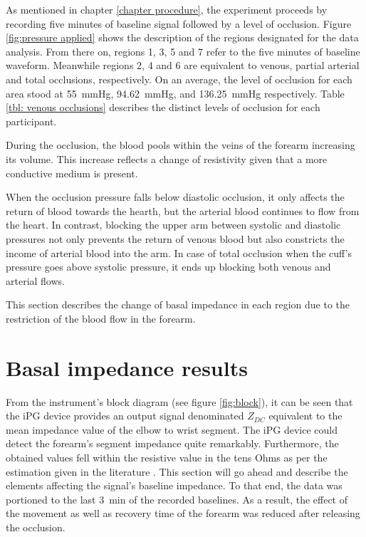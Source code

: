 As mentioned in chapter \ref{chapter procedure}, the experiment proceeds by recording five minutes of baseline signal followed by a level of occlusion. Figure \ref{fig:pressure applied} shows the description of the regions designated for the data analysis. From there on, regions 1, 3, 5 and 7 refer to the five minutes of baseline waveform. Meanwhile regions 2, 4 and 6 are equivalent to venous, partial arterial and total occlusions, respectively. On an average, the level of occlusion for each area stood at \SI{55}{\mmHg}, \SI{94.62}{\mmHg}, and  \SI{136.25}{\mmHg} respectively. Table  \ref{tbl: venous occlusions} describes the distinct levels of occlusion for each participant. 

During the occlusion, the blood pools within the veins of the forearm increasing its volume. This increase reflects a change of resistivity given that a more conductive medium is present. 

When the occlusion pressure falls below diastolic occlusion, it only affects the return of blood towards the hearth, but the arterial blood continues to flow from the heart. In contrast, blocking the upper arm between systolic and diastolic pressures not only prevents the return of venous blood but also constricts the income of arterial blood into the arm. In case of total occlusion when the cuff's pressure goes above systolic pressure, it ends up blocking both venous and arterial flows. 

This section describes the change of basal impedance in each region due to the restriction of the blood flow in the forearm. 

\section{Basal impedance results}
\label{section basal 1}
From the instrument's block diagram (see figure \ref{fig:block}), it can be seen that the iPG device provides an output signal denominated $Z_{DC}$ equivalent to the mean impedance value of the elbow to wrist segment. The iPG device could detect the forearm's segment impedance quite remarkably. Furthermore, the obtained values fell within the resistive value in the tens Ohms as per the estimation given in the literature \cite{faes1999electric, grimnes1983impedance, dai2009vivo}. This section will go ahead and describe the elements affecting the signal's baseline impedance. To that end, the data was portioned to the last \SI{3}{\minute} of the recorded baselines. As a result, the effect of the movement as well as recovery time of the forearm was reduced after releasing the occlusion. 

